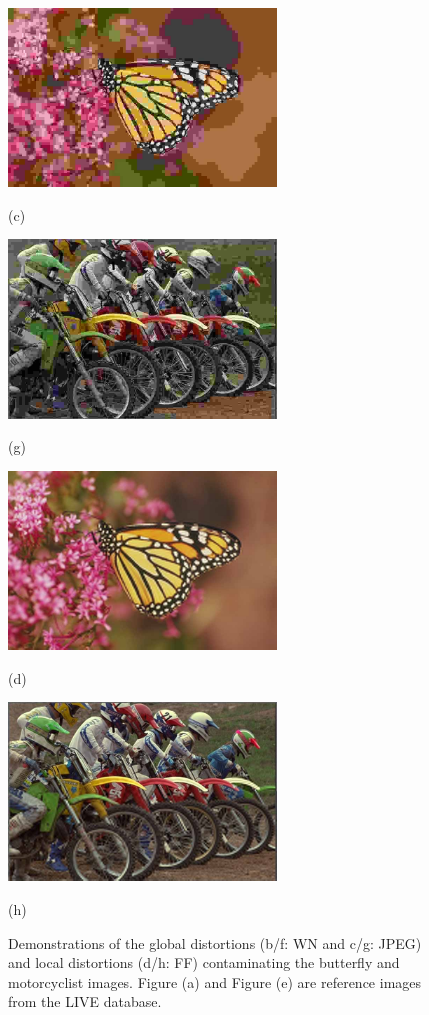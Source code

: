 \begin{figure}[!]
		\begin{minipage}[t]{.49\linewidth}
			\includegraphics[width=2.8in]{LIVE/JPEG/img170.jpg}
			\centerline{(c)}
		\end{minipage}
		\begin{minipage}[t]{.49\linewidth}
			\includegraphics[width=2.8in]{LIVE/JPEG/img29.jpg}
			\centerline{(g)}
		\end{minipage}
	
		\begin{minipage}[t]{.49\linewidth}
			\includegraphics[width=2.8in]{LIVE/FF/img137.jpg}
			\centerline{(d)}
		\end{minipage}
		\begin{minipage}[t]{.49\linewidth}
			\includegraphics[width=2.8in]{LIVE/FF/img35.jpg}
			\centerline{(h)}
		\end{minipage}
	
		\caption{Demonstrations of the global distortions (b/f: WN and c/g: JPEG) and local distortions (d/h: FF) contaminating the butterfly and motorcyclist images. Figure (a) and Figure (e) are reference images from the LIVE database.}
		\label{LIVE-Distortion-2}
	\end{figure}

